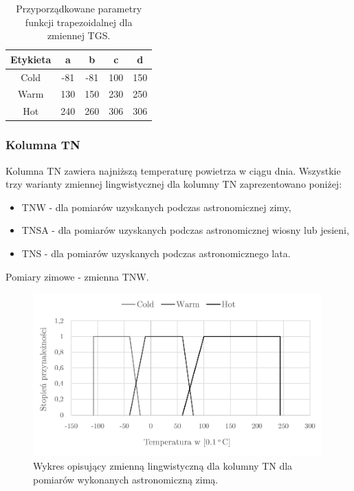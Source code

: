 \documentclass{classrep}
\begin{document}
\begin{table}[H]
	\centering
	\begin{tabular}{c c c c c} 
		\hline
		\textbf{Etykieta} & \textbf{a} & \textbf{b} & \textbf{c} & \textbf{d}\\ [0.5ex] 
		\hline
		\hline 
Cold	 &-81 & -81 & 100 & 150 \\
Warm & 130 & 150 & 230 & 250 \\
Hot	 & 240 & 260 & 306 & 306 \\
		\hline
	\end{tabular}
	\caption{Przyporządkowane parametry funkcji trapezoidalnej dla zmiennej TGS.}
\end{table}


\clearpage


\subsubsection{Kolumna TN}
Kolumna TN zawiera najniższą temperaturę powietrza w ciągu dnia. Wszystkie trzy warianty zmiennej lingwistycznej dla kolumny TN zaprezentowano poniżej:

\begin{itemize}[label=$\bullet$\scshape\bfseries]
\item TNW - dla pomiarów uzyskanych podczas astronomicznej zimy,
\item TNSA - dla pomiarów uzyskanych podczas astronomicznej wiosny lub jesieni,
\item TNS - dla pomiarów uzyskanych podczas astronomicznego lata.\newline\newline\newline
\end{itemize}


Pomiary zimowe - zmienna TNW.
\begin{figure}[H]
	\centering
	\includegraphics[width=0.99\textwidth]{Pictures/TermsCharts/TN_Z.png}
	\caption{Wykres opisujący zmienną lingwistyczną dla kolumny TN dla pomiarów wykonanych astronomiczną zimą.}
\end{figure}
\end{document}
